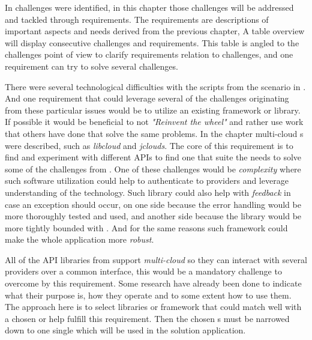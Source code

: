 
In  challenges were identified, in this chapter those challenges
will be addressed and tackled through requirements.
The requirements are descriptions of important aspects and needs derived from the previous chapter, 
A table overview will display consecutive challenges and requirements. 
This table is angled to the challenges point of view to clarify requirements relation to challenges,
and one requirement can try to solve several challenges.

There were several technological difficulties with the scripts from the scenario in 
.
And one requirement that could leverage several of the challenges
originating from these particular issues would be to utilize an existing framework or library.
If possible it would be beneficial to not \emph{"Reinvent the wheel"} and rather use work
that others have done that solve the same problems.
In the chapter  multi-cloud s 
were described, such as \emph{libcloud} and \emph{jclouds}.
The core of this requirement is to find and experiment with different APIs to find one
that suite the needs to solve some of the challenges from .
One of these challenges would be \emph{complexity} where such software utilization
could help to authenticate to providers and leverage understanding of the technology.
Such library could also help with \emph{feedback} in case an exception should occur, on one
side because the error handling would be more thoroughly tested and used,
and another side because the library would be more tightly bounded with .
And for the same reasons such framework could make the whole application more \emph{robust}.

All of the API libraries from  support \emph{multi-cloud} so they can
interact with several providers over a common interface, this would be a mandatory challenge
to overcome by this requirement.
Some research have already been done to indicate what their purpose is, 
how they operate and to some extent how to use them.
The approach here is to select libraries or framework that could match well with a chosen
 or help fulfill this requirement.
Then the chosen s must be narrowed down to one single  which will be
used in the solution application.

